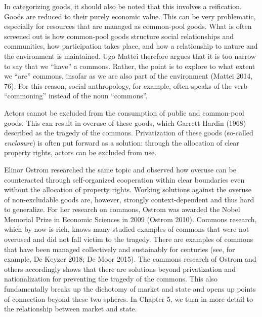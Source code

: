 \documentclass[
  british,
  a4paper,
  DIV=11,
  numbers=noendperiod,
  oneside,
  openany]{scrreprt}
\begin{document}
In categorizing goods, it should also be noted that this involves a
reification. Goods are reduced to their purely economic value. This can
be very problematic, especially for resources that are managed as
common-pool goods. What is often screened out is how common-pool goods
structure social relationships and communities, how participation takes
place, and how a relationship to nature and the environment is
maintained. Ugo Mattei therefore argues that it is too narrow to say
that we ``have'' a commons. Rather, the point is to explore to what
extent we ``are'' commons, insofar as we are also part of the
environment (Mattei 2014, 76). For this reason, social anthropology, for
example, often speaks of the verb ``commoning'' instead of the noun
``commons''.

\begin{tcolorbox}[enhanced jigsaw, arc=.35mm, bottomrule=.15mm, bottomtitle=1mm, breakable, colback=white, colbacktitle=quarto-callout-tip-color!10!white, colframe=quarto-callout-tip-color-frame, coltitle=black, left=2mm, leftrule=.75mm, opacityback=0, opacitybacktitle=0.6, rightrule=.15mm, title={The tragedy of the commons and how to overcome it}, titlerule=0mm, toprule=.15mm, toptitle=1mm]

Actors cannot be excluded from the consumption of public and common-pool
goods. This can result in overuse of these goods, which Garrett Hardin
(1968) described as the tragedy of the commons. Privatization of these
goods (so-called \emph{enclosure}) is often put forward as a solution:
through the allocation of clear property rights, actors can be excluded
from use.

Elinor Ostrom researched the same topic and observed how overuse can be
counteracted through self-organized cooperation within clear boundaries
even without the allocation of property rights. Working solutions
against the overuse of non-excludable goods are, however, strongly
context-dependent and thus hard to generalize. For her research on
commons, Ostrom was awarded the Nobel Memorial Prize in Economic
Sciences in 2009 (Ostrom 2010). Commons research, which by now is rich,
knows many studied examples of commons that were not overused and did
not fall victim to the tragedy. There are examples of commons that have
been managed collectively and sustainably for centuries (see, for
example, De Keyzer 2018; De Moor 2015). The commons research of Ostrom
and others accordingly shows that there are solutions beyond
privatization and nationalization for preventing the tragedy of the
commons. This also fundamentally breaks up the dichotomy of market and
state and opens up points of connection beyond these two spheres. In
Chapter 5, we turn in more detail to the relationship between market and
state.

\end{tcolorbox}
\end{document}

